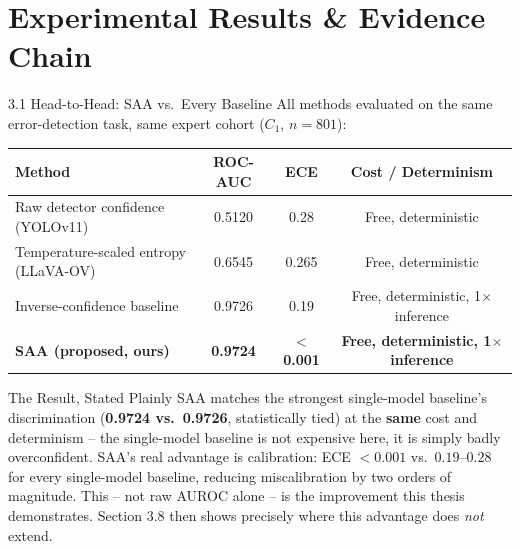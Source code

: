 \documentclass[aspectratio=169,11pt]{beamer}
\newcommand{\evidence}[1]{\textcolor{HildesheimRed}{\textbf{#1}}}
\begin{document}
\section{Experimental Results \& Evidence Chain}

\begin{frame}{3.1 Head-to-Head: SAA vs.\ Every Baseline}
\footnotesize
\centering
All methods evaluated on the same error-detection task, same expert cohort ($C_1$, $n=801$):
\begin{table}[!htbp]
\centering
\begin{tabular}{lccc}
\toprule
\textbf{Method} & \textbf{ROC-AUC} & \textbf{ECE} & \textbf{Cost / Determinism} \\
\midrule
Raw detector confidence (YOLOv11) & 0.5120 & 0.28 & Free, deterministic \\
Temperature-scaled entropy (LLaVA-OV) & 0.6545 & 0.265 & Free, deterministic \\
Inverse-confidence baseline & 0.9726 & 0.19 & Free, deterministic, 1$\times$ inference \\
\midrule
\textbf{SAA (proposed, ours)} & \textbf{0.9724} & \textbf{$<$0.001} & \textbf{Free, deterministic, 1$\times$ inference} \\
\bottomrule
\end{tabular}
\end{table}
\begin{alertblock}{The Result, Stated Plainly}
SAA matches the strongest single-model baseline's discrimination (\evidence{0.9724 vs.\ 0.9726}, statistically tied) at the \textbf{same} cost and determinism -- the single-model baseline is not expensive here, it is simply badly overconfident. SAA's real advantage is calibration: ECE $<0.001$ vs.\ $0.19$--$0.28$ for every single-model baseline, reducing miscalibration by two orders of magnitude. This -- not raw AUROC alone -- is the improvement this thesis demonstrates. Section 3.8 then shows precisely where this advantage does \emph{not} extend.
\end{alertblock}
\end{frame}
\end{document}
